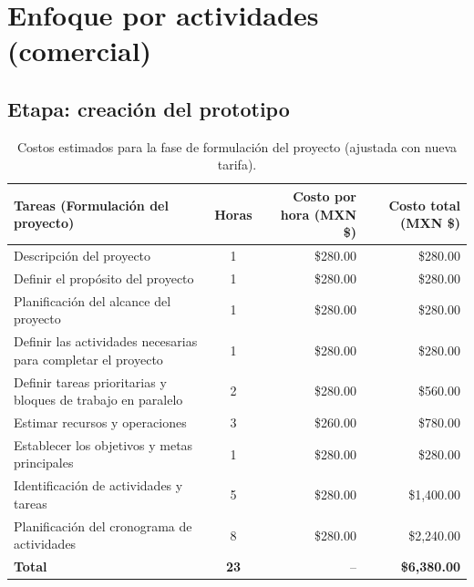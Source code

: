 \chapter{Enfoque por actividades (comercial)}
\label{anexo:actividades_comercial}  %
\section{Etapa: creación del prototipo}
\begin{table}[H]
	\centering
	\renewcommand{\arraystretch}{1.6}
	\setlength{\tabcolsep}{10pt}
	\Huge
	\begin{adjustbox}{max width=\textwidth}
		\begin{tabular}{|p{9.5cm}|c|r|r|}
			\hline
			\textbf{Tareas (Formulación del proyecto)} & \textbf{Horas} & \textbf{Costo por hora (MXN \$)} & \textbf{Costo total (MXN \$)} \\ \hline
			Descripción del proyecto & 1 & \$280.00 & \$280.00 \\ \hline
			Definir el propósito del proyecto & 1 & \$280.00 & \$280.00 \\ \hline
			Planificación del alcance del proyecto & 1 & \$280.00 & \$280.00 \\ \hline
			Definir las actividades necesarias para completar el proyecto & 1 & \$280.00 & \$280.00 \\ \hline
			Definir tareas prioritarias y bloques de trabajo en paralelo & 2 & \$280.00 & \$560.00 \\ \hline
			Estimar recursos y operaciones & 3 & \$260.00 & \$780.00 \\ \hline
			Establecer los objetivos y metas principales & 1 & \$280.00 & \$280.00 \\ \hline
			Identificación de actividades y tareas & 5 & \$280.00 & \$1,400.00 \\ \hline
			Planificación del cronograma de actividades & 8 & \$280.00 & \$2,240.00 \\ \hline
			\textbf{Total} & \textbf{23} & -- & \textbf{\$6,380.00} \\ \hline
		\end{tabular}
	\end{adjustbox}
	\caption{Costos estimados para la fase de formulación del proyecto (ajustada con nueva tarifa).}
	\label{tab:costos_formulacion_tarifa280}
\end{table}

